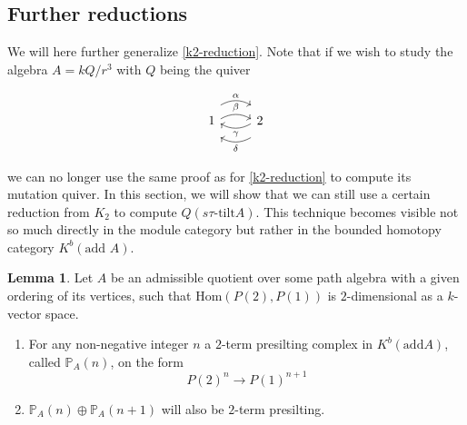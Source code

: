 \documentclass[]{article}
\theoremstyle{definition}
\newtheorem{lemma}{Lemma}[section]
\newcommand{\tu}{\ensuremath{\tau}}
\begin{document}
\subsection{Further reductions}
We will here further generalize \cref{k2-reduction}. Note that if we wish to study the algebra $A = kQ/r^3$ with $Q$ being the quiver

\[\begin{tikzcd}
	1 
	\arrow[r,bend left,shift right = 0.5ex, "\beta"]
	\arrow[r,bend left, shift left = 2ex, "\alpha"]
	& 2 \arrow[l,bend left,shift right = 0.5ex,"\gamma"]
	\arrow[l,bend left,shift left = 2ex, "\delta"]  \\
\end{tikzcd}
\]

we can no longer use the same proof as for \cref{k2-reduction} to compute its mutation quiver. In this section, we will show that we can still use a certain reduction from $K_2$ to compute $Q(s\tu\text{-tilt} A)$. This technique becomes visible not so much directly in the module category but rather in the bounded homotopy category $K^b(\text{add } A)$.



\begin{lemma}\label{2term-reduction}
	Let $A$ be an admissible quotient over some path algebra with a given ordering of its vertices, such that $\text{Hom}(P(2),P(1))$ is $2$-dimensional as a $k$-vector space. 
	
	\begin{enumerate}
		\item For any non-negative integer $n$ a $2$-term presilting complex in $K^b(\text{add} A)$, called $\mathbb{P}_A(n)$, on the form \[P(2)^n \to P(1)^{n+1}\]
		\item $\mathbb{P}_A(n) \oplus \mathbb{P}_A(n+1)$ will also be $2$-term presilting.
	\end{enumerate}

	

\end{lemma}
\end{document}

